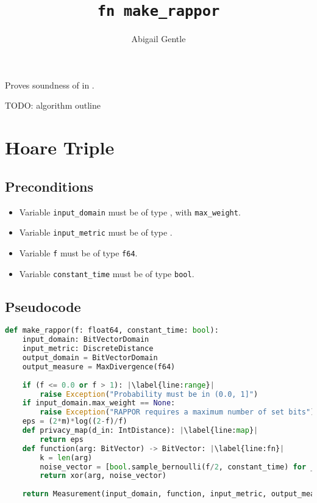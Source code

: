 \documentclass{article}
\title{\texttt{fn make\_rappor}}
\author{Abigail Gentle}
\begin{document}
\maketitle



\contrib

Proves soundness of  in .

TODO: algorithm outline
\section{Hoare Triple}
\subsection{Preconditions}
\begin{itemize}
	\item Variable \texttt{input\_domain} must be of type , with \texttt{max\_weight}.
	\item Variable \texttt{input\_metric} must be of type .
	\item Variable \texttt{f} must be of type \texttt{f64}.
    \item Variable \texttt{constant\_time} must be of type \texttt{bool}.
\end{itemize}

\subsection*{Pseudocode}
\begin{lstlisting}[language=Python, escapechar=|]
def make_rappor(f: float64, constant_time: bool):
    input_domain: BitVectorDomain
    input_metric: DiscreteDistance
    output_domain = BitVectorDomain
    output_measure = MaxDivergence(f64)
    
    if (f <= 0.0 or f > 1): |\label{line:range}|
        raise Exception("Probability must be in (0.0, 1]")
    if input_domain.max_weight == None: 
        raise Exception("RAPPOR requires a maximum number of set bits")
    eps = (2*m)*log((2-f)/f)
    def privacy_map(d_in: IntDistance): |\label{line:map}|
        return eps
    def function(arg: BitVector) -> BitVector: |\label{line:fn}|
    	k = len(arg)
    	noise_vector = [bool.sample_bernoulli(f/2, constant_time) for _ in range(k)]
    	return xor(arg, noise_vector)
    
    return Measurement(input_domain, function, input_metric, output_measure, privacy_map)
\end{lstlisting}
\end{document}
